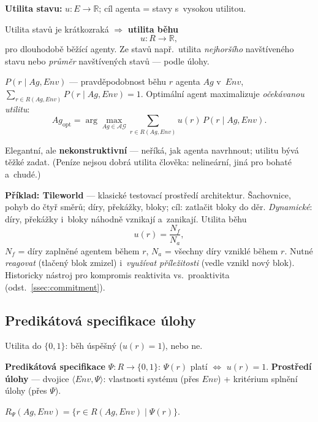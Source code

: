 \documentclass[11pt,a4paper]{article}
\theoremstyle{definition}
\begin{document}
\begin{defbox}[Utilita]
\textbf{Utilita stavu:} $u : E \to \mathbb{R}$; cíl agenta = stavy s~vysokou utilitou.

Utilita stavů je krátkozraká $\Rightarrow$ \textbf{utilita běhu}
\[
u : R \to \mathbb{R} ,
\]
pro dlouhodobě běžící agenty. Ze stavů např.\ utilita \emph{nejhoršího} navštíveného stavu
nebo \emph{průměr} navštívených stavů --- podle úlohy.
\end{defbox}

\begin{defbox}
$P(r \mid Ag, \mathit{Env})$ --- pravděpodobnost běhu $r$ agenta $Ag$ v~$\mathit{Env}$,
$\sum_{r \in R(Ag,\mathit{Env})} P(r \mid Ag,\mathit{Env}) = 1$. Optimální agent maximalizuje
\emph{očekávanou utilitu}:
\[
Ag_{\mathrm{opt}} = \arg\max_{Ag \in \mathcal{AG}} \sum_{r \in R(Ag,\mathit{Env})}
u(r)\, P(r \mid Ag, \mathit{Env}).
\]
\end{defbox}

Elegantní, ale \textbf{nekonstruktivní} --- neříká, jak agenta navrhnout; utilitu bývá těžké
zadat. (Peníze nejsou dobrá utilita člověka: nelineární, jiná pro bohaté a~chudé.)

\textbf{Příklad: Tileworld} --- klasické testovací prostředí architektur. Šachovnice, pohyb do
čtyř směrů; díry, překážky, bloky; cíl: zatlačit bloky do děr. \emph{Dynamické}: díry, překážky
i~bloky náhodně vznikají a~zanikají. Utilita běhu
\[
u(r) = \frac{N_f}{N_a},
\]
$N_f$ = díry zaplněné agentem během $r$, $N_a$ = všechny díry vzniklé během $r$. Nutné
\emph{reagovat} (tlačený blok zmizel) i~\emph{využívat příležitosti} (vedle vznikl nový blok).
Historicky nástroj pro kompromis reaktivita vs.\ proaktivita (odst.~\ref{ssec:commitment}).

\subsection{Predikátová specifikace úlohy}

Utilita do $\{0,1\}$: běh úspěšný ($u(r)=1$), nebo ne.

\begin{defbox}
\textbf{Predikátová specifikace} $\Psi : R \to \{0,1\}$: $\Psi(r)$ platí $\iff$ $u(r) = 1$.
\textbf{Prostředí úlohy} --- dvojice $\langle \mathit{Env}, \Psi \rangle$: vlastnosti systému
(přes $\mathit{Env}$) + kritérium splnění úlohy (přes $\Psi$).

$R_\Psi(Ag,\mathit{Env}) = \{ r \in R(Ag,\mathit{Env}) \mid \Psi(r) \}$.
\end{defbox}
\end{document}
